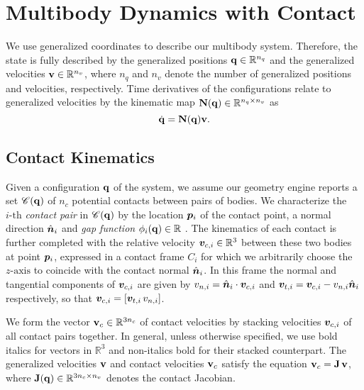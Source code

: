 \section{Multibody Dynamics with Contact}
\label{sec:multibody_dynamics_with_contact}

We use generalized coordinates to describe our multibody system. Therefore, the
state is fully described by the generalized positions
${\mathbf{q}}\in\mathbb{R}^{n_q}$ and the generalized velocities
${\mathbf{v}}\in\mathbb{R}^{n_v}$, where $n_q$ and $n_v$ denote the number of
generalized positions and velocities, respectively. Time derivatives of the
configurations relate to generalized velocities by the kinematic map ${\mathbf{N}}({\mathbf{q}})\in\mathbb{R}^{n_q\times
n_v}$ as
\begin{equation}
    \dot{\mf{q}}=\mf{N}(\mf{q})\mf{v}.
    \label{eq:v_to_qdot}
\end{equation}

\subsection{Contact Kinematics}
\label{sec:contact_modeling}

Given a configuration ${\mathbf{q}}$ of the system, we assume our geometry engine
reports a set $\mathscr{C}({\mathbf{q}})$ of $n_c$ potential contacts between pairs of
bodies. We characterize the $i\text{-th}$ \emph{contact pair} in
$\mathscr{C}({\mathbf{q}})$ by the location ${\bm{p}}_i$ of the contact point, a normal
direction $\hat{{\bm{n}}}_i$ and \emph{gap function} $\phi_i({\mathbf{q}})\in\mathbb{R}$
\cite{bib:flores2021contact,bib:pfeiffer1996multibody}. The kinematics of each
contact is further completed with the relative velocity
${\bm{v}}_{c,i}\in\mathbb{R}^3$ between these two bodies at point ${\bm{p}}_i$,
expressed in a contact frame $C_i$ for which we arbitrarily choose the
$z\text{-axis}$ to coincide with the contact normal $\hat{{\bm{n}}}_i$. In this
frame the normal and tangential components of ${\bm{v}}_{c,i}$ are given by
$v_{n,i} = \hat{{\bm{n}}}_i\cdot{\bm{v}}_{c,i}$ and ${\bm{v}}_{t,i} =
{\bm{v}}_{c,i}-v_{n,i}\hat{{\bm{n}}}_i$ respectively, so that
${\bm{v}}_{c,i}=[{\bm{v}}_{t,i}\,v_{n,i}]$.

We form the vector ${\mathbf{v}}_{c}\in\mathbb{R}^{3n_c}$ of contact velocities by
stacking velocities ${\bm{v}}_{c,i}$ of all contact pairs together. In general,
unless otherwise specified, we use bold italics for vectors in $\mathbb{R}^3$
and non-italics bold for their stacked counterpart. The generalized velocities
${\mathbf{v}}$ and contact velocities ${\mathbf{v}}_c$ satisfy the equation
${\mathbf{v}}_c={\mathbf{J}}\,{\mathbf{v}}$, where ${\mathbf{J}}({\mathbf{q}})\in\mathbb{R}^{3n_c\times n_v}$
denotes the contact Jacobian.

